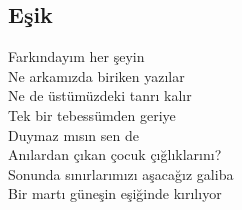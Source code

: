 \subsection{Eşik}

Farkındayım her şeyin \\
Ne arkamızda biriken yazılar \\
Ne de üstümüzdeki tanrı kalır \\
Tek bir tebessümden geriye \\

\noindent\newline
Duymaz mısın sen de \\
Anılardan çıkan çocuk çığlıklarını? \\
Sonunda sınırlarımızı aşacağız galiba \\
Bir martı güneşin eşiğinde kırılıyor \\